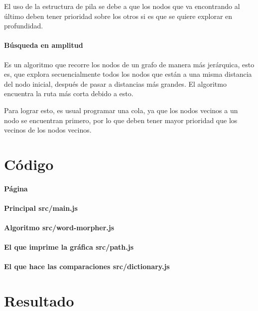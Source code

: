 \documentclass[40pt,a4paper]{article}
\begin{document}
El uso de la estructura de pila se debe a que los nodos que va encontrando
al último deben tener prioridad sobre los otros si es que se quiere explorar
en profundidad.

\paragraph{Búsqueda en amplitud}
Es un algoritmo que recorre los nodos de un grafo de manera más jerárquica,
esto es, que explora secuencialmente todos los nodos que están a una misma
distancia del nodo inicial, después de pasar a distancias más grandes. El
algoritmo encuentra la ruta más corta debido a esto.

Para lograr esto, es usual programar una cola, ya que los nodos vecinos
a un nodo se encuentran primero, por lo que deben tener mayor prioridad
que los vecinos de los nodos vecinos.

\section{Código}

\paragraph{Página}


\paragraph{Principal src/main.js}


\paragraph{Algoritmo src/word-morpher.js}


\paragraph{El que imprime la gráfica src/path.js}


\paragraph{El que hace las comparaciones src/dictionary.js}


\section{Resultado}
\end{document}
